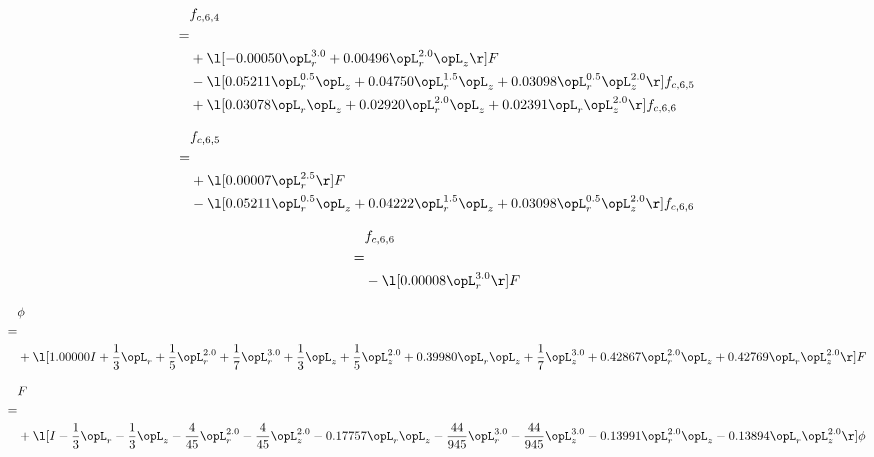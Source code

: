 \begin{alignat}{2} 
\label{eq:f_64_2} 
& f_{c,6,4} \nonumber \\ 
 = \\ 
& + \l[  -0.00050 \opL_r^{3.0} +  0.00496 \opL_r^{2.0} \opL_z  \r] F \nonumber \\ 
& - \l[  0.05211 \opL_r^{0.5} \opL_z +  0.04750 \opL_r^{1.5} \opL_z +  0.03098 \opL_r^{0.5} \opL_z^{2.0}  \r] f_{c,6,5} \nonumber \\ 
& + \l[  0.03078 \opL_r \opL_z +  0.02920 \opL_r^{2.0} \opL_z +  0.02391 \opL_r \opL_z^{2.0}  \r] f_{c,6,6} \nonumber \\ 
\end{alignat} 


\begin{alignat}{2} 
\label{eq:f_65_2} 
& f_{c,6,5} \nonumber \\ 
 = \\ 
& + \l[  0.00007 \opL_r^{2.5}  \r] F \nonumber \\ 
& - \l[  0.05211 \opL_r^{0.5} \opL_z +  0.04222 \opL_r^{1.5} \opL_z +  0.03098 \opL_r^{0.5} \opL_z^{2.0}  \r] f_{c,6,6} \nonumber \\ 
\end{alignat} 


\begin{alignat}{2} 
\label{eq:f_66_2} 
& f_{c,6,6} \nonumber \\ 
 = \\ 
& - \l[  0.00008 \opL_r^{3.0}  \r] F \nonumber \\ 
\end{alignat} 


\begin{alignat}{2} 
\label{eq:scalarFlux_1} 
& \phi \nonumber \\ 
 = \\ 
& + \l[  1.00000 I + \frac{1}{3} \opL_r + \frac{1}{5} \opL_r^{2.0} + \frac{1}{7} \opL_r^{3.0} + \frac{1}{3} \opL_z + \frac{1}{5} \opL_z^{2.0} +  0.39980 \opL_r \opL_z + \frac{1}{7} \opL_z^{3.0} +  0.42867 \opL_r^{2.0} \opL_z +  0.42769 \opL_r \opL_z^{2.0}  \r] F \nonumber \\ 
\end{alignat} 


\begin{alignat}{2} 
\label{eq:transport3D_0} 
& F \nonumber \\ 
 = \\ 
& + \l[ I - \frac{1}{3} \opL_r - \frac{1}{3} \opL_z - \frac{4}{45} \opL_r^{2.0} - \frac{4}{45} \opL_z^{2.0}   -0.17757 \opL_r \opL_z - \frac{44}{945} \opL_r^{3.0} - \frac{44}{945} \opL_z^{3.0}   -0.13991 \opL_r^{2.0} \opL_z   -0.13894 \opL_r \opL_z^{2.0}  \r] \phi \nonumber \\ 
\end{alignat} 


